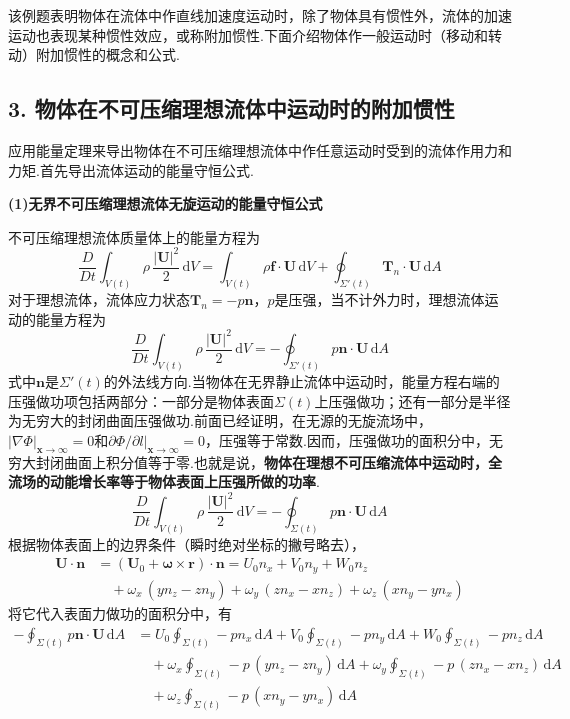 该例题表明物体在流体中作直线加速度运动时，除了物体具有惯性外，流体的加速运动也表现某种惯性效应，或称附加惯性.下面介绍物体作一般运动时（移动和转动）附加惯性的概念和公式.

\subsection*{3. 物体在不可压缩理想流体中运动时的附加惯性}

应用能量定理来导出物体在不可压缩理想流体中作任意运动时受到的流体作用力和力矩.首先导出流体运动的能量守恒公式.

\textbf{(1)无界不可压缩理想流体无旋运动的能量守恒公式}

不可压缩理想流体质量体上的能量方程为
\[
\frac{D}{Dt}\int_{V(t)}\rho\,\frac{|\boldsymbol{U}|^{2}}{2}\,\mathrm{d}V=\int_{V(t)}\rho\boldsymbol{f}\cdot\boldsymbol{U}\,\mathrm{d}V+\oint_{\Sigma'(t)}\boldsymbol{T}_n\cdot\boldsymbol{U}\,\mathrm{d}A
\]
对于理想流体，流体应力状态$\boldsymbol{T}_n=-p\boldsymbol{n}$，$p$是压强，当不计外力时，理想流体运动的能量方程为
\[
\frac{D}{Dt}\int_{V(t)}\rho\,\frac{|\boldsymbol{U}|^{2}}{2}\,\mathrm{d}V=-\oint_{\Sigma'(t)}p\boldsymbol{n}\cdot\boldsymbol{U}\,\mathrm{d}A
\]
式中$\boldsymbol{n}$是$\Sigma'(t)$的外法线方向.当物体在无界静止流体中运动时，能量方程右端的压强做功项包括两部分：一部分是物体表面$\Sigma(t)$上压强做功；还有一部分是半径为无穷大的封闭曲面压强做功.前面已经证明，在无源的无旋流场中，$|\nabla\Phi|_{\boldsymbol{x}\to\infty}=0$和$\partial\Phi/\partial l|_{\boldsymbol{x}\to\infty}=0$，压强等于常数.因而，压强做功的面积分中，无穷大封闭曲面上积分值等于零.也就是说，\textbf{物体在理想不可压缩流体中运动时，全流场的动能增长率等于物体表面上压强所做的功率}.
\[
\frac{D}{Dt}\int_{V(t)}\rho\,\frac{|\boldsymbol{U}|^{2}}{2}\,\mathrm{d}V=-\oint_{\Sigma(t)}p\boldsymbol{n}\cdot\boldsymbol{U}\,\mathrm{d}A
\]
根据物体表面上的边界条件（瞬时绝对坐标的撇号略去），
\begin{align*}
\boldsymbol{U}\cdot\boldsymbol{n}&=(\boldsymbol{U}_0+\boldsymbol{\omega}\times\boldsymbol{r})\cdot\boldsymbol{n}=U_0 n_x+V_0 n_y+W_0 n_z\\
&\quad+\omega_x\,(y n_z-z n_y)+\omega_y\,(z n_x-x n_z)+\omega_z\,(x n_y-y n_x)
\end{align*}
将它代入表面力做功的面积分中，有
\begin{align*}
-\oint_{\Sigma(t)}p\boldsymbol{n}\cdot\boldsymbol{U}\,\mathrm{d}A&=U_0\oint_{\Sigma(t)}-p n_x\,\mathrm{d}A+V_0\oint_{\Sigma(t)}-p n_y\,\mathrm{d}A+W_0\oint_{\Sigma(t)}-p n_z\,\mathrm{d}A\\
&\quad+\omega_x\oint_{\Sigma(t)}-p\,(y n_z-z n_y)\,\mathrm{d}A+\omega_y\oint_{\Sigma(t)}-p\,(z n_x-x n_z)\,\mathrm{d}A\\
&\quad+\omega_z\oint_{\Sigma(t)}-p\,(x n_y-y n_x)\,\mathrm{d}A
\end{align*}
